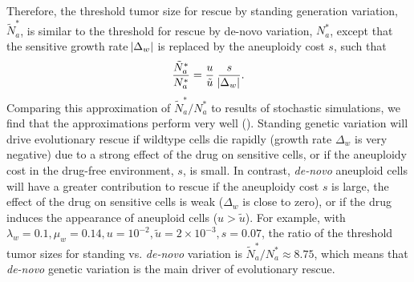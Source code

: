 \documentclass[12pt]{extarticle}
\begin{document}
Therefore, the threshold tumor size for rescue by standing generation variation, $\tilde{N}^*_{a}$, is similar to the threshold for rescue by de-novo variation, $N^*_a$, except that the sensitive growth rate $\abs{\Delta_w}$ is replaced by the aneuploidy cost $s$, such that
\begin{equation}\label{eq:Nsgv}
\frac{\tilde{N}^*_{a}}{N^*_{a}} = \frac{u}{\tilde{u}} \; \frac{s}{\abs{\Delta_w}}.
\end{equation}
Comparing this approximation of $\tilde{N}^*_{a}/N^*_{a}$ to results of stochastic simulations, we find that the approximations perform very well (). 
Standing genetic variation will drive evolutionary rescue if wildtype cells die rapidly (growth rate $\Delta_w$ is very negative) due to a strong effect of the drug on sensitive cells, or if the aneuploidy cost in the drug-free environment, $s$, is small.  
In contrast, \emph{de-novo} aneuploid cells will have a greater contribution to rescue if the aneuploidy cost $s$ is large, the effect of the drug on sensitive cells is weak ($\Delta_w$ is close to zero), or if the drug induces the appearance of aneuploid cells ($u > \tilde u$).
For example, with  $\lambda_w=0.1,\mu_w=0.14, u=10^{-2}, \tilde{u}=2\times10^{-3}, s=0.07$, the ratio of the threshold tumor sizes for standing vs. \emph{de-novo} variation is $\tilde{N}^*_a/N^*_a \approx 8.75$, which means that \emph{de-novo} genetic variation is  the main driver of evolutionary rescue.
\end{document}
